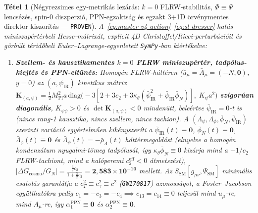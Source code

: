 \documentclass[11pt,a4paper]{article}
\newtheorem{theorem}{Tétel}
\begin{document}
\begin{theorem}[Négyrezsimes egy-metrikás lezárás: $k = 0$ FLRW-stabilitás, $\Phi \equiv \Psi$ lencsézés, spin-0 diszperzió, PPN-egzaktság és egzakt 3+1D örvénymentes direktor-kiszorítás --- \textnormal{{\upshape\texttt{PROVEN}}}]
\label{thm:covariant-helmholtz}
A~\eqref{eq:master-v4-action}--\eqref{eq:sl-dresser} hatás miniszupértérbeli Hesse-mátrixát, explicit 4D Christoffel/Ricci-perturbációit és görbült téridőbeli Euler--Lagrange-egyenleteit \texttt{SymPy}-ban kiértékelve:
\begin{enumerate}
  \item \textbf{Szellem- és kausztikamentes $k = 0$ FLRW miniszupértér, tadpólus-kiejtés és PPN-eltűnés:} Homogén FLRW-háttéren ($\bar{u}_\mu = \bar{A}_\mu = (-N, \mathbf{0})$, $y = 0$) az $(a,\bar{\psi}_{\mathrm{IR}})$ kinetikus mátrix $\mathbf{K}_{(a,\psi)} = \frac{1}{2}M_{\mathrm{Pl}}^2 a\,\mathrm{diag}\bigl(-3[2 + 3c_2 + 3\kappa_\theta(\bar{\psi}_{\mathrm{IR}}^2 + \bar{\psi}_{\mathrm{IR}}\bar{\phi}_N)],\; K_\psi a^2\bigr)$ \textbf{szigorúan diagonális}, $K_{\psi\psi} > 0$ és $\det\mathbf{K}_{(a,\psi)} < 0$ mindenütt, beleértve $\bar{\psi}_{\mathrm{IR}} = 0$-t is (nincs rang-1 kausztika, nincs szellem, nincs tachion). A $(\Lambda_\psi, \Lambda_\phi, \bar{\phi}_N, \bar{\psi}_{\mathrm{IR}})$ szerinti variáció egyértelműen kikényszeríti a $\bar{\psi}_{\mathrm{IR}}(t) \equiv \mathbf{0}$, $\bar{\phi}_N(t) \equiv \mathbf{0}$, $\bar{\Lambda}_\phi(t) \equiv \mathbf{0}$ és $\bar{\Lambda}_\psi(t) = -\bar{\rho}_A(t)$ háttérmegoldást (elnyelve a homogén kondenzátum nyugalmi-tömeg tadpólusát, így $\kappa_\theta\bar{\phi}_N \equiv 0$ kizárja mind a $+1/c_2$ FLRW-tachiont, mind a halóperemi $c_2^{\mathrm{eff}} < 0$ átmetszést), $|\Delta G_{\mathrm{cosmo}}/G_N| = \frac{\frac{3}{2}c_2}{1 + \frac{3}{2}c_2} = \mathbf{2{,}583\times 10^{-10}}$ mellett. Az $S_{\mathrm{SM}}[g_{\mu\nu},\Psi_{\mathrm{SM}}]$ minimális csatolás garantálja a $c_T^2 \equiv c_\gamma^2 \equiv c^2$ (\texttt{GW170817}) azonosságot, a Foster--Jacobson együtthatókra \cite{JacobsonMattingly2001,FosterJacobson2006,OostMukohyamaWang2018} pedig $c_1 = -c_3 = -c_4 \implies c_{13} = c_{14} \equiv 0$ teljesül \emph{mind} $u_\mu$-re, \emph{mind} $A_\mu$-re, így $\alpha_1^{\mathrm{PPN}} \equiv \mathbf{0}$ és $\alpha_2^{\mathrm{PPN}} \equiv \mathbf{0}$.

\end{enumerate}
\end{theorem}
\end{document}

